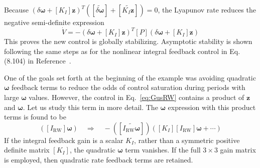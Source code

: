 \documentclass[]{BasiliskReportMemo}
\begin{document}
		Because $(\delta\bm\omega + [K_{I}]\bm z )^{T}  ([\widetilde{\delta\bm\omega}] + [\widetilde{K_{I}\bm z}] ) = 0$, the Lyapunov rate reduces the negative semi-definite expression
		\begin{equation*}
			\dot V = -  (\delta\bm\omega + [K_{I}]\bm z )^{T} [P]  (\delta\bm\omega + [K_{I}]\bm z )
		\end{equation*}
		This proves the new control is globally stabilizing.  Asymptotic stability is shown following the same steps as for the  nonlinear integral feedback control in Eq. (8.104) in Reference~.  
		
		One of the goals set forth at the beginning of the example was avoiding quadratic $\bm\omega$ feedback terms to reduce the odds of control saturation during periods with large $\bm\omega$ values.  However, the control in Eq.~\eqref{eq:GusRW} contains a product of $\bm z$ and $\bm\omega$.  Let us study this term in more detail.  The $\bm\omega$ expression with this product terms is found to be
		\begin{equation*}
			[\widetilde{K_{I}\bm z}] ([I_{\text{RW}}]\bm \omega)
			 \quad \Rightarrow \quad 
			-  (
			[\widetilde{I_{\text{RW}} \bm \omega}] 
			 ) ([K_{I}] [I_{\text{RW}}] \bm \omega + \cdots )
		\end{equation*}
		If the integral feedback gain is a scalar $K_{I}$, rather than a symmetric positive definite matrix $[K_{I}]$, the quadratic $\bm\omega$ term vanishes.  If the full $3\times 3$ gain matrix is employed, then quadratic rate feedback terms are retained.  
\end{document}
